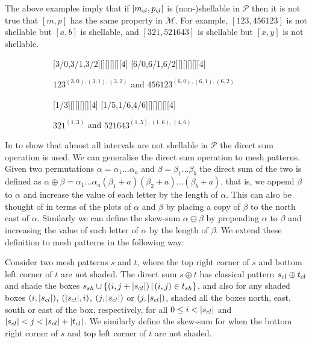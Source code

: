 \documentclass[11pt,a4paper,oneside]{article}
\begin{document}
The above examples imply that if $[m_{cl},p_{cl}]$ is (non-)shellable in $\mathcal{P}$
then it is not true that $[m,p]$ has the same property in $\mathcal{M}$. For example,
$[123,456123]$ is not shellable but $[a,b]$ is shellable, and
$[321,521643]$ is shellable but $[x,y]$
is not shellable.

\begin{figure}[h]\centering
\begin{subfigure}{0.45\textwidth}\centering
{}[3/0,3/1,3/2][][][][][4]
[6/0,6/1,6/2][][][][][4]
\caption{$123^{(3,0),(3,1),(3,2)}$ and $456123^{(6,0),(6,1),(6,2)}$}\label{fig:123}
\end{subfigure}
\begin{subfigure}{0.45\textwidth}\centering
{}[1/3][][][][][4]
[1/5,1/6,4/6][][][][][4]
\caption{$321^{(1, 3)}$ and $521643^{(1, 5), (1, 6), (4, 6)}$}\label{fig:321}
\end{subfigure}
\caption{}
\end{figure}

In \cite{McSt13} to show that almost all intervals are not shellable in $\mathcal{P}$
the direct sum operation is used. We can generalise the direct sum operation to
mesh patterns. Given two permutations $\alpha=\alpha_1\ldots\alpha_a$ and
$\beta=\beta_1\ldots\beta_b$ the direct sum of the two is defined as
$\alpha\oplus\beta=\alpha_1\ldots\alpha_a(\beta_1+a)(\beta_2+a)\ldots(\beta_b+a)$,
that is, we append $\beta$ to $\alpha$ and increase the value of each letter by the
length of $\alpha$. This can also be thought of in terms of the plots of $\alpha$
and $\beta$ by placing a copy of $\beta$ to the north east of $\alpha$.
Similarly we can define the skew-sum $\alpha\ominus\beta$ by
prepending $\alpha$ to $\beta$ and increasing the value of each letter of $\alpha$
by the length of $\beta$. We extend these definition to mesh patterns in the following way:

\begin{defn}\label{defn:directsum}
Consider two mesh patterns $s$ and $t$, where the top right corner of $s$
and bottom left corner of $t$ are not shaded. The direct sum $s\oplus t$ has classical pattern
$s_{cl}\oplus t_{cl}$ and shade the boxes $s_{sh}\cup\{(i,j+|s_{cl}|)\,|\,(i,j)\in t_{sh}\}$,
and also for any shaded boxes $(i,|s_{cl}|)$, $(|s_{cl}|,i)$, $(j,|s_{cl}|)$ or $(j,|s_{cl}|)$,
shaded all the boxes north, east, south or east of the box, respectively,
for all $0\le i< |s_{cl}|$ and $|s_{cl}|< j< |s_{cl}|+|t_{cl}|$.  We similarly
define the skew-sum for when the bottom right corner of $s$ and top left corner of $t$ are not shaded.
\end{defn}
\end{document}
